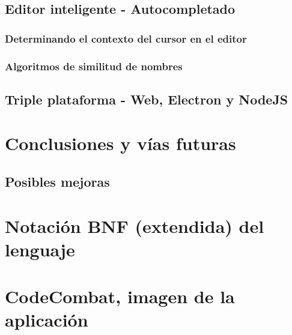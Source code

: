 \documentclass{report}
\begin{document}
	\section{Editor inteligente - Autocompletado}
	
	
	\subsection{Determinando el contexto del cursor en el editor}
	
	\subsection{Algoritmos de similitud de nombres}
	
	\section{Triple plataforma - Web, Electron y NodeJS}
	
	\chapter{Conclusiones y vías futuras}
	
	\section{Posibles mejoras}
	
	
	

	\appendix
	\chapter{Notación BNF (extendida) del lenguaje} \label{app:a}
	
	
	
	\chapter{CodeCombat, imagen de la aplicación} \label{app:b}
	
\end{document}
